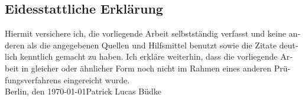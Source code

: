 \newpage
\begin{otherlanguage}{ngerman}
\thispagestyle{empty}
\section*{Eidesstattliche Erklärung}
\thispagestyle{empty}
Hiermit versichere ich, die vorliegende Arbeit selbstständig verfasst und keine anderen als die angegebenen Quellen und Hilfsmittel benutzt sowie die Zitate deutlich kenntlich gemacht zu haben.
\newline
Ich erkläre weiterhin, dass die vorliegende Arbeit in gleicher oder ähnlicher Form noch nicht im Rahmen eines
anderen Prüfungsverfahrens eingereicht wurde.
\vspace{4\baselineskip}\\
Berlin, den \today \hfill Patrick Lucas Büdke 
\vspace{4\baselineskip}\\
\end{otherlanguage}